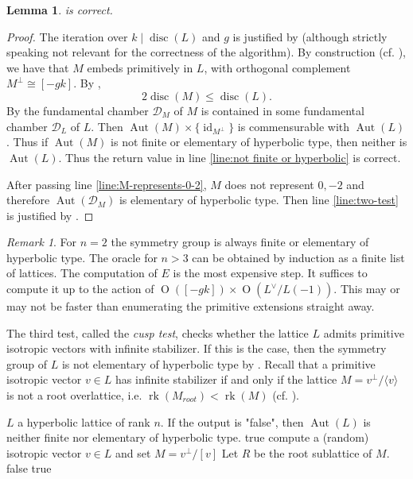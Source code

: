 \documentclass[11pt,letterpaper]{amsart}
\DeclareMathOperator{\rk}{rk}
\DeclareMathOperator{\Aut}{Aut}
\DeclareMathOperator{\id}{id}
\DeclareMathOperator{\disc}{disc}
\DeclareMathOperator{\Or}{O}
\newcommand{\D}{\mathcal{D}}
\newtheorem{lemma}[theorem]{Lemma}
\theoremstyle{definition}
\theoremstyle{remark}
\newtheorem{remark}[theorem]{Remark}
\begin{document}
\begin{lemma}
 is correct.
\end{lemma}
\begin{proof}
The iteration over $k \mid \disc(L)$ and $g$ is justified by  (although strictly speaking not relevant for the correctness of the algorithm).
By construction (cf. ), we have that $M$ embeds primitively in $L$, with orthogonal complement $M^\perp \cong [-gk]$. By  
,
\[2 \disc(M) \leq \disc(L).\]
By  the fundamental chamber $\D_M$ of $M$ is contained in some fundamental chamber $\D_L$ of $L$. Then $\Aut(M)\times \{\id_{M^\perp}\}$ is commensurable with $\Aut(L)$. Thus if $\Aut(M)$ is not finite or elementary of hyperbolic type, then neither is $\Aut(L)$.
Thus the return value in line \ref{line:not finite or hyperbolic} is correct. 

After passing line \ref{line:M-represents-0-2}, $M$ does not represent $0,-2$ and therefore $\Aut(\mathcal{D}_M)$ is elementary of hyperbolic type. Then line \ref{line:two-test} is justified by .
\end{proof}



\begin{remark}
For $n=2$ the symmetry group is always finite or elementary of hyperbolic type. 
The oracle for $n>3$ can be obtained by induction as a finite list of lattices. 
The computation of $E$ is the most expensive step. It suffices to compute it up to the action of $\Or([-gk])\times \Or(L^\vee/L(-1))$. This may or may not be faster than enumerating the primitive extensions straight away. 
\end{remark}

The third test, called the \emph{cusp test}, checks whether the lattice $L$ admits primitive isotropic vectors with infinite stabilizer. If this is the case, then the symmetry group of $L$ is not elementary of hyperbolic type by . Recall that a primitive isotropic vector $v\in L$ has infinite stabilizer if and only if the lattice $M=v^\perp/\langle v \rangle$ is not a root overlattice, i.e. $\rk(M_{root}) < \rk(M)$ (cf. \cite[Proposition~3.2]{brandhorst.mezzedimi}). 

\begingroup
{}\label{alg:cusp test}
\endgroup
\begin{algorithmic}[1]
\REQUIRE $L$ a hyperbolic lattice of rank $n$.
\ENSURE If the output is "false", then $\Aut(L)$ is neither finite nor elementary of hyperbolic type.
\RETURN true
\ENDIF
\STATE compute a (random) isotropic vector $v \in L$ and set $M=v^\perp/[v]$
\STATE Let $R$ be the root sublattice of $M$.
\IF{$\rk R < n -2$}
\RETURN false 
\ENDIF 
\RETURN true
\end{algorithmic}\hrulefill\\
\end{document}
